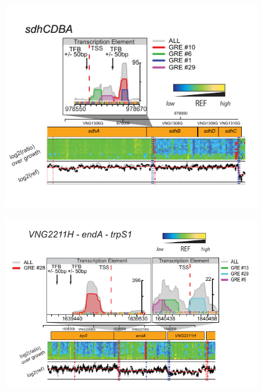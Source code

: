 \begin{figure}[hp]
\centering
\includegraphics[width=0.95\linewidth]{figures/sdh.pdf}
\caption[GREs regulate multiple transcript isoforms from operons in {\it H. salinarum}, \textit{sdhCDBA}.]{\textbf{\DIFaddFL{, }\textit{}} }
\label{fig:sdh}
\end{figure}

\begin{figure}[hp]
\centering
\includegraphics[width=0.95\linewidth]{figures/vng2211h.pdf}
\caption[GREs regulate multiple transcript isoforms from operons in {\it H. salinarum}, \textit{VNG2211H-endA-trpS1}.]{\textbf{\DIFaddFL{, }\textit{}} }
\label{fig:vng2211h}
\end{figure}

